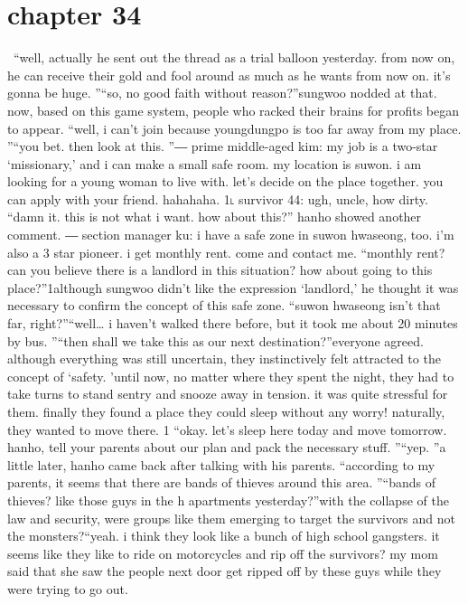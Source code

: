 \section{chapter 34}






 “well, actually he sent out the thread as a trial balloon yesterday.
 from now on, he can receive their gold and fool around as much as he wants from now on.
 it’s gonna be huge.
”“so, no good faith without reason?”sungwoo nodded at that.
now, based on this game system, people who racked their brains for profits began to appear.
“well, i can’t join because youngdungpo is too far away from my place.
”“you bet.
 then look at this.
”― prime middle-aged kim: my job is a two-star ‘missionary,’ and i can make a small safe room.
 my location is suwon.
 i am looking for a young woman to live with.
 let’s decide on the place together.
 you can apply with your friend.
 hahahaha.
1˪ survivor 44: ugh, uncle, how dirty.
“damn it.
 this is not what i want.
 how about this?” hanho showed another comment.
― section manager ku: i have a safe zone in suwon hwaseong, too.
 i’m also a 3 star pioneer.
 i get monthly rent.
 come and contact me.
“monthly rent? can you believe there is a landlord in this situation? how about going to this place?”1although sungwoo didn’t like the expression ‘landlord,’ he thought it was necessary to confirm the concept of this safe zone.
“suwon hwaseong isn’t that far, right?”“well… i haven’t walked there before, but it took me about 20 minutes by bus.
”“then shall we take this as our next destination?”everyone agreed.
 although everything was still uncertain, they instinctively felt attracted to the concept of ‘safety.
’until now, no matter where they spent the night, they had to take turns to stand sentry and snooze away in tension.
 it was quite stressful for them.
 finally they found a place they could sleep without any worry! naturally, they wanted to move there.
1
“okay.
 let’s sleep here today and move tomorrow.
 hanho, tell your parents about our plan and pack the necessary stuff.
”“yep.
”a little later, hanho came back after talking with his parents.
“according to my parents, it seems that there are bands of thieves around this area.
”“bands of thieves? like those guys in the h apartments yesterday?”with the collapse of the law and security, were groups like them emerging to target the survivors and not the monsters?“yeah.
 i think they look like a bunch of high school gangsters.
 it seems like they like to ride on motorcycles and rip off the survivors? my mom said that she saw the people next door get ripped off by these guys while they were trying to go out.
